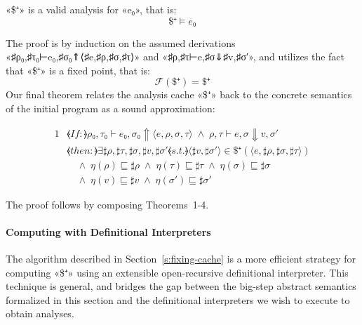 \begin{theorem}
  «\$⁺» is a valid analysis for «e₀», that is:
  \[ \$⁺ ⊨ e₀ \]
\end{theorem}
The proof is by induction on the assumed derivations
«♯{ρ}₀,♯{τ}₀⊢e₀,♯{σ}₀⇑⟨♯{e},♯{ρ},♯{σ},♯{τ}⟩» and «♯{ρ},♯{τ}⊢e,♯{σ}⇓♯{v},♯{σ}′»,
and utilizes the fact that «\$⁺» is a fixed point, that is:
\[ ℱ(\$⁺) = \$⁺ \]
Our final theorem relates the analysis cache «\$⁺» back to the concrete
semantics of the initial program as a sound approximation:
\begin{theorem}
  \begin{alignat*}{1}
    & ⦑If:⦒ \mathrel{} ρ₀,τ₀⊢e₀,σ₀⇑⟨e,ρ,σ,τ⟩ \;∧\; ρ,τ⊢e,σ⇓v,σ′  \\
    & ⦑then:⦒ \mathrel{} ∃♯{ρ},♯{τ},♯{σ},♯{v},♯{σ}′ \mathrel{⦑s.t.⦒}  ⟨♯{v},♯{σ}′⟩ ∈ \$⁺(⟨e,♯{ρ},♯{σ},♯{τ}⟩)  \\
    & \hspace{1em} ∧\; η(ρ) ⊑ ♯{ρ} \;∧\; η(τ) ⊑ ♯{τ} \;∧\; η(σ) ⊑ ♯{σ} \\
    & \hspace{1em} ∧\; η(v) ⊑ ♯{v} \;∧\; η(σ′) ⊑ ♯{σ}′
  \end{alignat*}
\end{theorem}
The proof follows by composing Theorems~1-4.

\paragraph{Computing with Definitional Interpreters}

The algorithm described in Section~\ref{s:fixing-cache} is a more efficient strategy for
computing «\$⁺» using an extensible open-recursive definitional interpreter.
This technique is general, and bridges the gap between the big-step abstract
semantics formalized in this section and the definitional interpreters we wish
to execute to obtain analyses.


